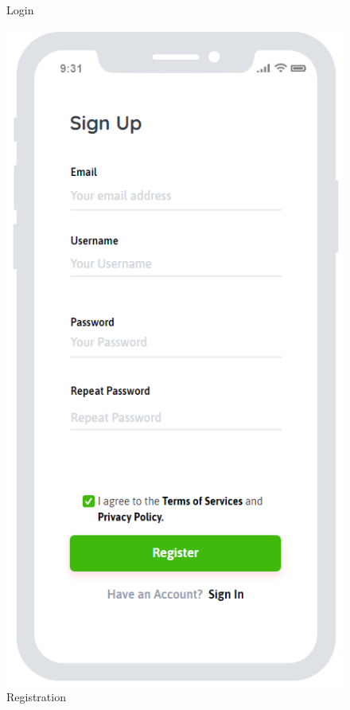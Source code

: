 \begin{figure}[H]
\begin{minipage}{0.3\linewidth}
\caption{Login}
\end{minipage} 
\hfill 
\begin{minipage}{0.3\linewidth} 
\includegraphics[width=\textwidth]{./Images/MockupLogo/mockRegistration}
\caption{Registration}
\end{minipage} 
\hfill 

\end{figure}
